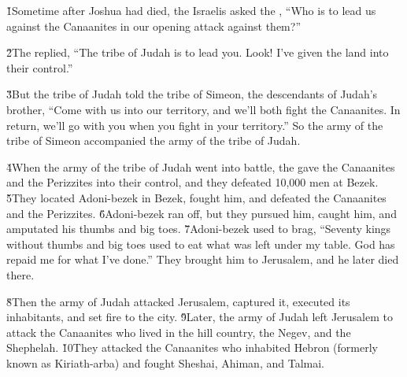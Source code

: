 


\v{1}Sometime after Joshua had died, the Israelis asked the , ``Who is to lead us against the Canaanites in our opening attack against them?''

\v{2}The  replied, ``The tribe of Judah is to lead you. Look! I've given the land into their control.''

\v{3}But the tribe of Judah told the tribe of Simeon, the descendants of Judah's brother, ``Come with us into our territory, and we'll both fight the Canaanites. In return, we'll go with you when you fight in your territory.'' So the army of the tribe of Simeon accompanied the army of the tribe of Judah.

\v{4}When the army of the tribe of Judah went into battle, the  gave the Canaanites and the Perizzites into their control, and they defeated 10,000 men at Bezek. \v{5}They located Adoni-bezek in Bezek, fought him, and defeated the Canaanites and the Perizzites. \v{6}Adoni-bezek ran off, but they pursued him, caught him, and amputated his thumbs and big toes. \v{7}Adoni-bezek used to brag, ``Seventy kings without thumbs and big toes used to eat what was left under my table. God has repaid me for what I've done.'' They brought him to Jerusalem, and he later died there.

\v{8}Then the army of Judah attacked Jerusalem, captured it, executed its inhabitants, and set fire to the city. \v{9}Later, the army of Judah left Jerusalem to attack the Canaanites who lived in the hill country, the Negev, and the Shephelah. \v{10}They attacked the Canaanites who inhabited Hebron (formerly known as Kiriath-arba) and fought Sheshai, Ahiman, and Talmai.

